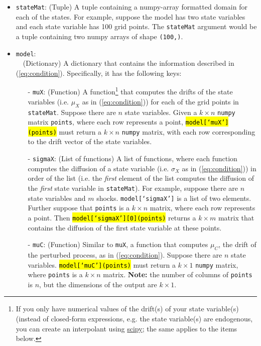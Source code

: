 \documentclass[12pt]{article}
\DeclareRobustCommand{\hlCODE}[1]{{\sethlcolor{backcolour}\hl{#1}}}
\begin{document}
\begin{itemize}
\item \texttt{stateMat}: (Tuple) A tuple containing a numpy-array formatted domain for each of the states. For example, suppose the model has two state variables and each state variable has 100 grid points. The \texttt{stateMat} argument would be a tuple containing two numpy arrays of shape \texttt{(100,)}. 

\item \texttt{model}: \\~\ (Dictionary) A dictionary that contains the information described in (\ref{eq:condition}). Specifically, it has the following keys:
	\begin{itemize}
	\item[-] \texttt{muX}: (Function) A function\footnote{If you only have numerical values of the drift(s) of your state variable(s) (instead of closed-form expressions, e.g. the state variable(s) are endogenous, you can create an interpolant using \href{https://docs.scipy.org/doc/scipy/reference/tutorial/interpolate.html}{scipy}; the same applies to the items below.} that computes the drifts of the state variables (i.e. $\mu_X$ as in (\ref{eq:condition})) for each of the grid points in \texttt{stateMat}. Suppose there are $n$ state variables. Given a $k \times n$ \texttt{numpy} matrix \texttt{points}, where each row represents a point, \hlCODE{\texttt{model[`muX'](points)}} must return a $k \times n$ \texttt{numpy} matrix, with each row corresponding to the drift vector of the state variables. 
	\item[-] \texttt{sigmaX}: (List of functions) A list of functions, where each function computes the diffusion of a state variable (i.e. $\sigma_X$ as in (\ref{eq:condition})) in order of the list (i.e. the \textit{first} element of the list computes the diffusion of the \textit{first} state variable in \texttt{stateMat}). For example, suppose there are $n$ state variables and $m$ shocks. \texttt{model[`sigmaX']} is a list of two elements. Further suppose that \texttt{points} is a $k \times n$ matrix, where each row represents a point. Then \hlCODE{\texttt{model[`sigmaX'][0](points)}} returns a $k \times m$ matrix that contains the diffusion of the first state variable at these points.
	\item[-] \texttt{muC}: (Function) Similar to \texttt{muX}, a function that computes $\mu_C$, the drift of the perturbed process, as in (\ref{eq:condition}). Suppose there are $n$ state variables. \hlCODE{\texttt{model[`muC'](points)}} must return a $k \times 1$ \texttt{numpy} matrix, where \texttt{points} is a $k \times n$ matrix. \textbf{Note:} the number of columns of \texttt{points} is $n$, but the dimensions of the output are $k \times 1$.

\end{itemize}
\end{itemize}
\end{document}
